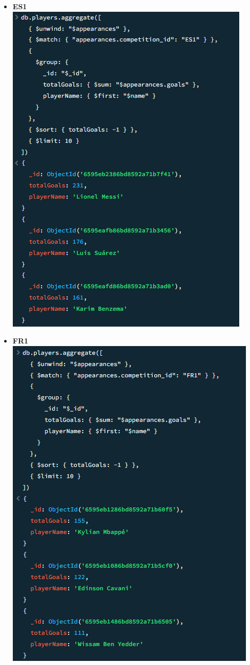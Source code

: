 \documentclass{Configuration_Files/PoliMi3i_thesis}
\begin{document}
\begin{itemize}
    \newpage
    \item \textbf{ES1}\\
    \includegraphics[scale=0.8]{Images/Queries/Competitions_statistics/top_goalscorers/ES1.png}
    \item \textbf{FR1}\\
    \includegraphics[scale=0.8]{Images/Queries/Competitions_statistics/top_goalscorers/FR1.png}

\end{itemize}
\end{document}

